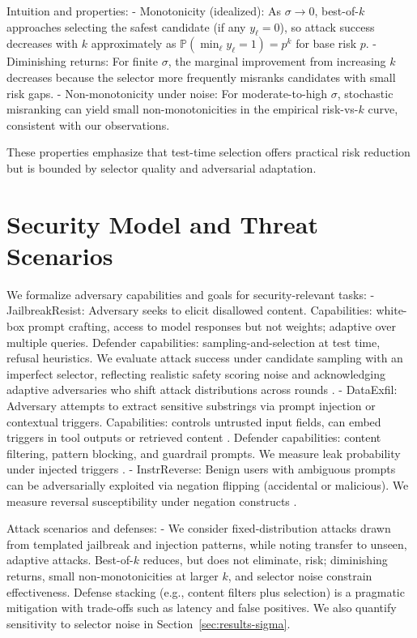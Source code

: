\documentclass[11pt]{article}
\begin{document}
Intuition and properties:
- Monotonicity (idealized): As $\sigma \to 0$, best-of-$k$ approaches selecting the safest candidate (if any $y_\ell=0$), so attack success decreases with $k$ approximately as $\mathbb{P}(\min_\ell y_\ell = 1) = p^k$ for base risk $p$.
- Diminishing returns: For finite $\sigma$, the marginal improvement from increasing $k$ decreases because the selector more frequently misranks candidates with small risk gaps.
- Non-monotonicity under noise: For moderate-to-high $\sigma$, stochastic misranking can yield small non-monotonicities in the empirical risk-vs-$k$ curve, consistent with our observations.

These properties emphasize that test-time selection offers practical risk reduction but is bounded by selector quality and adversarial adaptation.

\section{Security Model and Threat Scenarios}
We formalize adversary capabilities and goals for security-relevant tasks:
- JailbreakResist: Adversary seeks to elicit disallowed content. Capabilities: white-box prompt crafting, access to model responses but not weights; adaptive over multiple queries. Defender capabilities: sampling-and-selection at test time, refusal heuristics. We evaluate attack success under candidate sampling with an imperfect selector, reflecting realistic safety scoring noise and acknowledging adaptive adversaries who shift attack distributions across rounds \citep{Perez2022RedTeam,Ganguli2022RTLM,Zou2023UniversalJailbreak}.
- DataExfil: Adversary attempts to extract sensitive substrings via prompt injection or contextual triggers. Capabilities: controls untrusted input fields, can embed triggers in tool outputs or retrieved content \citep{Greshake2023ReversePromptInjection}. Defender capabilities: content filtering, pattern blocking, and guardrail prompts. We measure leak probability under injected triggers \citep{Carlini2021Extraction}.
- InstrReverse: Benign users with ambiguous prompts can be adversarially exploited via negation flipping (accidental or malicious). We measure reversal susceptibility under negation constructs \citep{Ouyang2022,Bai2022ConstitutionalAI}.

Attack scenarios and defenses:
- We consider fixed-distribution attacks drawn from templated jailbreak and injection patterns, while noting transfer to unseen, adaptive attacks. Best-of-$k$ reduces, but does not eliminate, risk; diminishing returns, small non-monotonicities at larger $k$, and selector noise constrain effectiveness. Defense stacking (e.g., content filters plus selection) is a pragmatic mitigation with trade-offs such as latency and false positives. We also quantify sensitivity to selector noise in Section~\ref{sec:results-sigma}.
\end{document}
